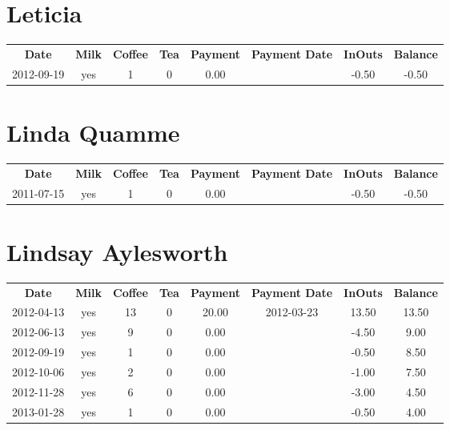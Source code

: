 \section{Leticia}

\begin{center}
\begin{tabular}{cccccccc}
\textbf{Date} & \textbf{Milk} & \textbf{Coffee} & \textbf{Tea} & \textbf{Payment} & \textbf{Payment Date} & \textbf{InOuts} & \textbf{Balance} \\
2012-09-19 & yes & 1 & 0 & 0.00 &  & -0.50 & -0.50
\end{tabular}
\end{center}

\section{Linda Quamme}

\begin{center}
\begin{tabular}{cccccccc}
\textbf{Date} & \textbf{Milk} & \textbf{Coffee} & \textbf{Tea} & \textbf{Payment} & \textbf{Payment Date} & \textbf{InOuts} & \textbf{Balance} \\
2011-07-15 & yes & 1 & 0 & 0.00 &  & -0.50 & -0.50
\end{tabular}
\end{center}

\section{Lindsay Aylesworth}

\begin{center}
\begin{tabular}{cccccccc}
\textbf{Date} & \textbf{Milk} & \textbf{Coffee} & \textbf{Tea} & \textbf{Payment} & \textbf{Payment Date} & \textbf{InOuts} & \textbf{Balance} \\
2012-04-13 & yes & 13 & 0 & 20.00 & 2012-03-23 & 13.50 & 13.50\\ 
2012-06-13 & yes &  9 & 0 &  0.00 &  & -4.50 &  9.00\\ 
2012-09-19 & yes &  1 & 0 &  0.00 &  & -0.50 &  8.50\\ 
2012-10-06 & yes &  2 & 0 &  0.00 &  & -1.00 &  7.50\\ 
2012-11-28 & yes &  6 & 0 &  0.00 &  & -3.00 &  4.50\\ 
2013-01-28 & yes &  1 & 0 &  0.00 &  & -0.50 &  4.00
\end{tabular}
\end{center}

